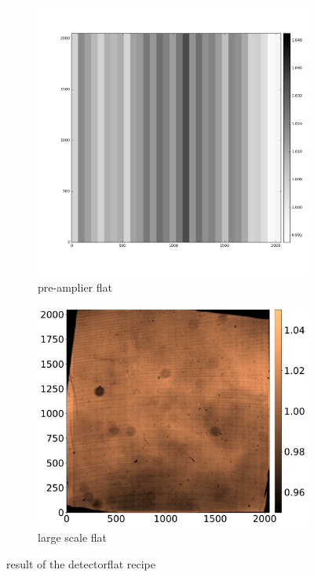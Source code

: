 \documentclass[twoside,single]{lion-msc}
\begin{document}
\begin{figure}[hb]
\centering
\begin{subfigure}{.5\textwidth}
  \centering
  \includegraphics[width=1\linewidth]{preampflat}
  \caption{pre-amplier flat}
  \label{fig:preampflat}
\end{subfigure}%
\begin{subfigure}{.5\textwidth}
  \centering
  \includegraphics[width=1\linewidth]{largescaleflat}
  \caption{large scale flat}
  \label{fig:largescaleflat}
\end{subfigure}
\caption{result of the detectorflat recipe}
\end{figure}
\end{document}
